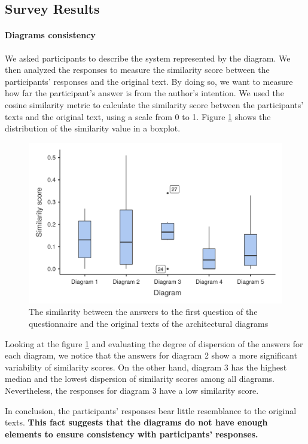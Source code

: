 \documentclass[sigconf]{acmart}
\begin{document}
\subsection{Survey Results}
\label{sec:survey-results}

\paragraph{Diagrams consistency}

We asked participants to describe the system represented by the diagram. We then analyzed the responses to measure the similarity score between the participants' responses and the original text. By doing so, we want to measure how far the participant's answer is from the author's intention. We used the cosine similarity metric to calculate the similarity score between the participants' texts and the original text, using a scale from 0 to 1. Figure \ref{fig:q1} shows the distribution of the similarity value in a boxplot.

\begin{figure}[h]
    \centering
    \includegraphics[width=0.8\columnwidth]{figures/similarity-boxplot.pdf}
    \caption{{\tiny The similarity between the answers to the first question of the questionnaire and the original texts of the architectural diagrams}}
    \label{fig:q1}
\end{figure}

Looking at the figure \ref{fig:q1} and evaluating the degree of dispersion of the answers for each diagram, we notice that the answers for diagram 2 show a more significant variability of similarity scores. On the other hand, diagram 3 has the highest median and the lowest dispersion of similarity scores among all diagrams. Nevertheless, the responses for diagram 3 have a low similarity score.

In conclusion, the participants' responses bear little resemblance to the original texts. \textbf{This fact suggests that the diagrams do not have enough elements to ensure consistency with participants' responses.}
\end{document}
